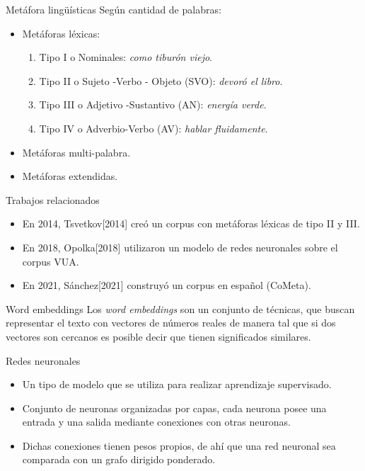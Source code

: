\documentclass[12pt]{beamer}
\begin{document}
\begin{frame}{Metáfora lingüísticas}
Según cantidad de palabras:
\begin{itemize}
\item  Metáforas léxicas:
\begin{enumerate}
\item Tipo I o Nominales: \textit{como tiburón viejo}.
\item Tipo II o Sujeto -Verbo - Objeto (SVO): \textit{devoró el libro}.
\item Tipo III o Adjetivo -Sustantivo (AN): \textit{energía verde}.
\item Tipo IV o Adverbio-Verbo (AV): \textit{hablar fluidamente}.
\end{enumerate}
\item Metáforas multi-palabra.
\item Metáforas extendidas.
\end{itemize}
\end{frame}

\begin{frame}{Trabajos relacionados}
\begin{itemize}
\item En 2014, Tsvetkov[2014] creó un corpus con metáforas léxicas de tipo II y III.
\item En 2018, Opolka[2018] utilizaron un modelo de redes neuronales sobre el corpus VUA.
\item  En 2021, Sánchez[2021] construyó un corpus en español (CoMeta).
\end{itemize}
\end{frame}
\begin{frame}{Word embeddings}
Los \textit{word embeddings} son un conjunto de técnicas, que buscan representar el texto con vectores de números reales de manera tal que si dos vectores son cercanos es posible decir que tienen significados similares.
\end{frame}
\begin{frame}{Redes neuronales}
\begin{itemize}
\item Un tipo de modelo que se utiliza para realizar aprendizaje supervisado.
\item Conjunto de neuronas organizadas por capas, cada neurona posee una entrada y una salida mediante conexiones con otras neuronas.
\item Dichas conexiones tienen pesos propios, de ahí que una red neuronal sea comparada con un grafo dirigido ponderado.
\end{itemize}
\end{frame}
\end{document}
